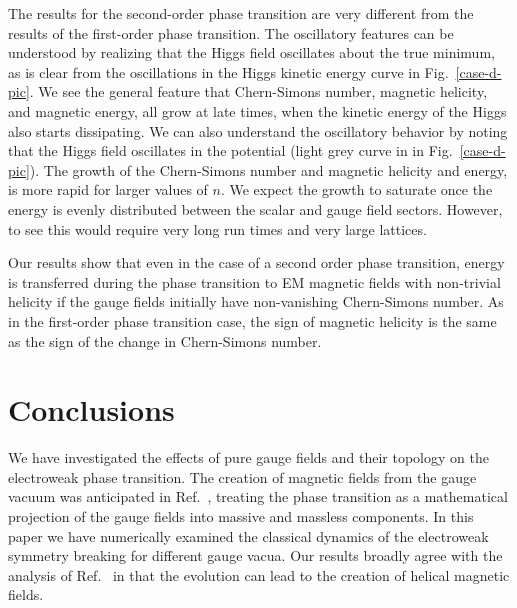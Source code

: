 \documentclass[prd,twocolumn,nofootinbib]{revtex4-1}
\begin{document}
The results for the second-order phase transition are very different from the results of
the first-order phase transition. The oscillatory features can be understood by realizing
that the Higgs field oscillates about the true minimum, as is clear
from the oscillations in the Higgs kinetic energy curve in Fig.~\ref{case-d-pic}. We see
the general feature that Chern-Simons number, magnetic helicity, and magnetic
energy, all grow at late times, when the kinetic energy of the Higgs also starts
dissipating. We can also understand the oscillatory behavior 
by noting that the Higgs field oscillates in the potential
(light grey curve in in Fig.~\ref{case-d-pic}).
The growth of the Chern-Simons number and magnetic helicity and energy,
is more rapid for larger values of $n$. We expect the growth to saturate once the
energy is evenly distributed between the scalar and gauge field sectors. However,
to see this would require very long run times and very large lattices. 

Our results show that even in the case of a second order phase transition, energy
is transferred during the phase transition to EM magnetic fields with non-trivial
helicity if the gauge fields initially have non-vanishing Chern-Simons number.
As in the first-order phase transition case, the sign of magnetic helicity is the 
same as the sign of the change in Chern-Simons number.


\section{Conclusions}
\label{sec:conclusions}

We have investigated the effects of pure gauge fields and their topology on the 
electroweak phase transition.
The creation of magnetic fields from the gauge vacuum was anticipated in 
Ref.~\cite{jackiw2000creation}, treating the phase
transition as a mathematical projection of the gauge fields into massive and massless
components. In this paper we have numerically examined the classical dynamics of
the electroweak symmetry breaking for different gauge vacua. Our results broadly agree 
with the analysis of Ref.~\cite{jackiw2000creation} in that the evolution can lead to the creation 
of helical magnetic fields. 
\end{document}
